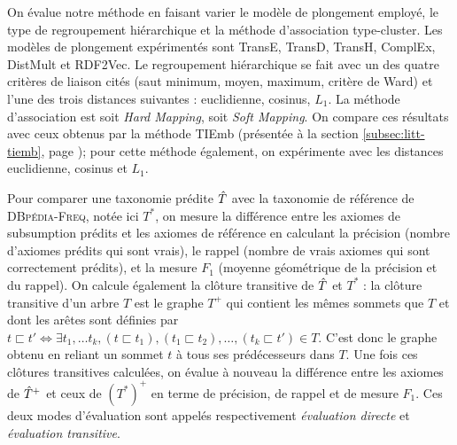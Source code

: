On évalue notre méthode en faisant varier le modèle de plongement employé, le type de regroupement hiérarchique et la méthode d'association type-cluster. Les modèles de plongement expérimentés sont TransE, TransD, TransH, ComplEx, DistMult et RDF2Vec. Le regroupement hiérarchique se fait avec un des quatre critères de liaison cités (saut minimum, moyen, maximum, critère de Ward) et l'une des trois distances suivantes : euclidienne, cosinus, $L_1$. %
La méthode d'association est soit \textit{Hard Mapping}, soit \textit{Soft Mapping}. On compare ces résultats avec ceux obtenus par la méthode TIEmb \cite{ristoski2017large} (présentée à la section \ref{subsec:litt-tiemb}, page \pageref{subsec:litt-tiemb}); pour cette méthode également, on expérimente avec les distances euclidienne, cosinus et $L_1$. 

Pour comparer une taxonomie prédite $\hat{T}$ avec la taxonomie de référence de \textsc{DBpédia-Freq}, notée ici $T^*$, on mesure la différence entre les axiomes de subsumption prédits et les axiomes de référence en calculant la précision (nombre d'axiomes prédits qui sont vrais), le rappel (nombre de vrais axiomes qui sont correctement prédits), et la mesure $F_1$ (moyenne géométrique de la précision et du rappel). On calcule également la clôture transitive de $\hat{T}$ et $T^*$ : la clôture transitive d'un arbre $T$ est le graphe $T^+$ qui contient les mêmes sommets que $T$ et dont les arêtes sont définies par $t \sqsubset t' \iff \exists t_1, \ldots t_k, (t \sqsubset t_1), (t_1 \sqsubset t_2), \ldots, (t_k \sqsubset t') \in T$. C'est donc le graphe obtenu en reliant un sommet $t$ à tous ses prédécesseurs dans $T$. Une fois ces clôtures transitives calculées, on évalue à nouveau la différence entre les axiomes de $\hat{T}^+$ et ceux de $(T^*)^+$ en terme de précision, de rappel et de mesure $F_1$. Ces deux modes d'évaluation sont appelés respectivement \textit{évaluation directe} et \textit{évaluation transitive}.

